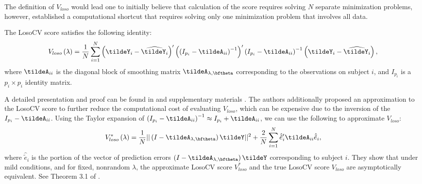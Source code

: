 \bigskip

The definition of $V_{loso}$ would lead one to initially believe that calculation of the score requires solving $N$ separate minimization problems, however, \cite{xu2012asymptotic} established a computational shortcut that requires solving only one minimization problem that involves all data. 
  
  \begin{lemma} \label{lemma:losocv-shortcut}
  The LosoCV score satisfies the following identity:
  \begin{equation*}
 V_{loso}\left( \lambda \right) = \frac{1}{N} \sum_{i = 1}^N \left(\tildeY_i - \widehat{\tildeY_i}\right)' \left(\left(I_{p_i} - \tildeA_{ii}\right)^{-1}\right)'\left(I_{p_i} - \tildeA_{ii}\right)^{-1}\left(\tildeY_i - \widehat{\tildeY_i}\right),
  \end{equation*}
  \noindent
  where $\tildeA_{ii}$ is the diagonal block of smoothing matrix $\tildeA_{\lambda,\bftheta}$ corresponding to the observations on subject $i$, and $I_{p_i}$ is a $p_i \times p_i$ identity matrix.
\end{lemma}

A detailed presentation and proof can be found in \cite{xu2012asymptotic} and supplementary materials \cite{xuasymptotic}.  The authors additionally proposed an approximation to the LosoCV score to further reduce the computational cost of evaluating $V_{loso}$, which can be expensive due to the inversion of the $I_{p_i} - \tildeA_{ii}$. Using the Taylor expansion of $\left(I_{p_i} - \tildeA_{ii}\right)^{-1} \approx I_{p_i} + \tildeA_{ii}$, we can use the following to approximate $V_{loso}$:
\begin{equation} \label{eq:approx-losocv}
V_{loso}^*\left( \lambda \right) = \frac{1}{N} \vert \vert \left(I - \tildeA_{\lambda,\bftheta}\right)\tildeY \vert \vert^2 + \frac{2}{N} \sum_{i = 1}^N \hat{\tilde{e}}'_{i}\tildeA_{ii}\hat{\tilde{e}}_i,
\end{equation}
\noindent
where $\hat{\tilde{e}}_i$ is the portion of the vector of prediction errors $\left(I - \tildeA_{\lambda,\bftheta}\right)\tildeY$ corresponding to subject $i$. They show that under mild conditions, and for fixed, nonrandom $\lambda$, the approximate LosoCV score $V_{loso}^*$ and the true LosoCV score $V_{loso}$ are asymptotically equivalent. See Theorem 3.1 of \cite{xu2012asymptotic}.
  

